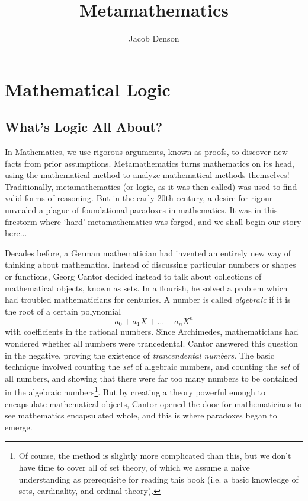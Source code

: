 

\title{Metamathematics}
\author{Jacob Denson}



\maketitle
\tableofcontents

\part{Mathematical Logic}

\chapter{What's Logic All About?}


In Mathematics, we use rigorous arguments, known as proofs, to discover new facts from prior assumptions. Metamathematics turns mathematics on its head, using the mathematical method to analyze mathematical methods themselves! Traditionally, metamathematics (or logic, as it was then called) was used to find valid forms of reasoning. But in the early 20th century, a desire for rigour unvealed a plague of foundational paradoxes in mathematics. It was in this firestorm where `hard' metamathematics was forged, and we shall begin our story here...

Decades before, a German mathematician had invented an entirely new way of thinking about mathematics. Instead of discussing particular numbers or shapes or functions, Georg Cantor decided instead to talk about collections of mathematical objects, known as sets. In a flourish, he solved a problem which had troubled mathematicians for centuries. A number is called {\it algebraic} if it is the root of a certain polynomial
%
\[ a_0 + a_1 X + \dots + a_n X^n \]
%
with coefficients in the rational numbers.  Since Archimedes, mathematicians had wondered whether all numbers were trancedental. Cantor answered this question in the negative, proving the existence of {\it trancendental numbers}. The basic technique involved counting the {\it set} of algebraic numbers, and counting the {\it set} of all numbers, and showing that there were far too many numbers to be contained in the algebraic numbers\footnote{Of course, the method is slightly more complicated than this, but we don't have time to cover all of set theory, of which we assume a naive understanding as prerequisite for reading this book (i.e. a basic knowledge of sets, cardinality, and ordinal theory).}. But by creating a theory powerful enough to encapsulate mathematical objects, Cantor opened the door for mathematicians to see mathematics encapsulated whole, and this is where paradoxes began to emerge.

